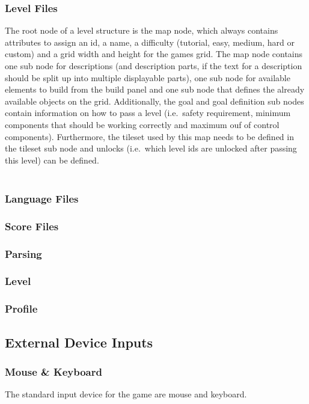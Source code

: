 \subsubsection{Level Files}\label{subsubsec:level-files}
The root node of a level structure is the map node, which always contains attributes to assign an id, a name, a difficulty (tutorial, easy, medium, hard or custom) and a
grid width and height for the games grid.
The map node contains one sub node for descriptions (and description parts, if the text for a description should be split up into multiple displayable parts),
one sub node for available elements to build from the build panel and one sub node that defines the already available objects on the grid.
Additionally, the goal and goal definition sub nodes contain information on how to pass a level (i.e.\ safety requirement, minimum components that should be working correctly and
maximum ouf of control components).
Furthermore, the tileset used by this map needs to be defined in the tileset sub node and unlocks (i.e.\ which level ids are unlocked after passing this level) can be defined.
\\ \\
\subsubsection{Language Files}\label{subsubsec:language-files}

\subsubsection{Score Files}\label{subsubsec:score-files}

\subsubsection{Parsing}\label{subsubsec:parsing}

\subsubsection{Level}
\subsubsection{Profile}
\subsection{External Device Inputs}\label{subsec:external-device-inputs}
\subsubsection{Mouse \& Keyboard}\label{subsubsec:mouse-&-keyboard}
The standard input device for the game are mouse and keyboard.
